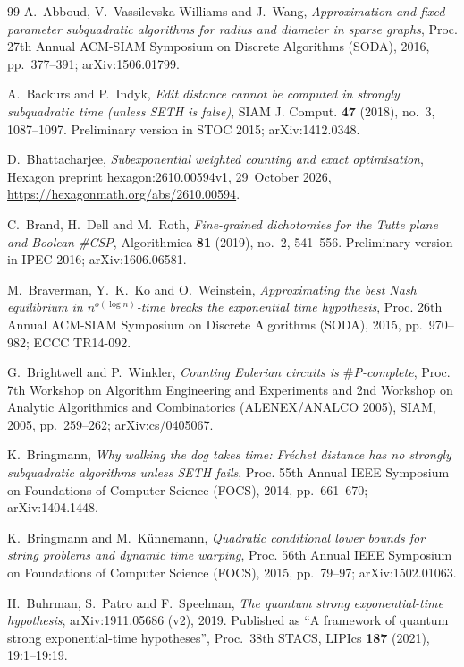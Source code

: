 \documentclass[10pt]{amsart}
\theoremstyle{plain}
\theoremstyle{definition}
\theoremstyle{remark}
\numberwithin{equation}{section}
\begin{document}
\begin{thebibliography}{99}
A.~Abboud, V.~Vassilevska Williams and J.~Wang, \emph{Approximation and fixed parameter
subquadratic algorithms for radius and diameter in sparse graphs}, Proc. 27th Annual ACM-SIAM
Symposium on Discrete Algorithms (SODA), 2016, pp.~377--391; arXiv:1506.01799.

A.~Backurs and P.~Indyk, \emph{Edit distance cannot be computed in strongly subquadratic time (unless
{SETH} is false)}, SIAM J. Comput. \textbf{47} (2018), no.~3, 1087--1097. Preliminary version in
STOC 2015; arXiv:1412.0348.

D.~Bhattacharjee, \emph{Subexponential weighted counting and exact optimisation}, Hexagon preprint
hexagon:2610.00594v1, 29~October 2026, \url{https://hexagonmath.org/abs/2610.00594}.

C.~Brand, H.~Dell and M.~Roth, \emph{Fine-grained dichotomies for the {T}utte plane and {B}oolean
\#{CSP}}, Algorithmica \textbf{81} (2019), no.~2, 541--556. Preliminary version in IPEC 2016;
arXiv:1606.06581.

M.~Braverman, Y.~K.~Ko and O.~Weinstein, \emph{Approximating the best {N}ash equilibrium in
$n^{o(\log n)}$-time breaks the exponential time hypothesis}, Proc. 26th Annual ACM-SIAM Symposium
on Discrete Algorithms (SODA), 2015, pp.~970--982; ECCC TR14-092.

G.~Brightwell and P.~Winkler, \emph{Counting {E}ulerian circuits is $\#${P}-complete}, Proc. 7th
Workshop on Algorithm Engineering and Experiments and 2nd Workshop on Analytic Algorithmics and
Combinatorics (ALENEX/ANALCO 2005), SIAM, 2005, pp.~259--262; arXiv:cs/0405067.

K.~Bringmann, \emph{Why walking the dog takes time: {F}r{\'e}chet distance has no strongly
subquadratic algorithms unless {SETH} fails}, Proc. 55th Annual IEEE Symposium on Foundations of
Computer Science (FOCS), 2014, pp.~661--670; arXiv:1404.1448.

K.~Bringmann and M.~K{\"u}nnemann, \emph{Quadratic conditional lower bounds for string problems and
dynamic time warping}, Proc. 56th Annual IEEE Symposium on Foundations of Computer Science (FOCS),
2015, pp.~79--97; arXiv:1502.01063.

H.~Buhrman, S.~Patro and F.~Speelman, \emph{The quantum strong exponential-time hypothesis},
arXiv:1911.05686 (v2), 2019. Published as ``A framework of quantum strong exponential-time
hypotheses'', Proc.\ 38th STACS, LIPIcs \textbf{187} (2021), 19:1--19:19.


\end{thebibliography}
\end{document}
